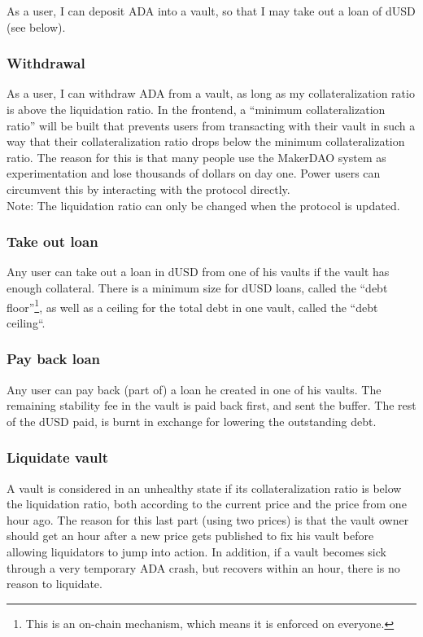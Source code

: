 \documentclass{article} %
\begin{document}
As a user, I can deposit ADA into a vault, so that I may take out a loan of dUSD
(see below).

\subsubsection*{Withdrawal}

As a user, I can withdraw ADA from a vault, as long as my collateralization
ratio is above the liquidation ratio.
In the frontend, a ``minimum collateralization ratio'' will be built that
prevents users from transacting with their vault in such a way that their
collateralization ratio drops below the minimum collateralization ratio.
The reason for this is that many people use the MakerDAO system as
experimentation and lose thousands of dollars on day one.
Power users can circumvent this by interacting with the protocol directly. \\

Note: The liquidation ratio can only be changed when the protocol is updated.

\subsubsection*{Take out loan}

Any user can take out a loan in dUSD from one of his vaults if the vault has
enough collateral. There is a minimum size for dUSD loans, called the ``debt
floor''\footnote{
  This is an on-chain mechanism, which means it is enforced on everyone.
}, as well as a ceiling for the total debt in one vault, called the ``debt
ceiling``.

\subsubsection*{Pay back loan}

Any user can pay back (part of) a loan he created in one of his vaults. The
remaining stability fee in the vault is paid back first, and sent the buffer.
The rest of the dUSD paid, is burnt in exchange for lowering the outstanding
debt.

\subsubsection*{Liquidate vault}

A vault is considered in an unhealthy state if its collateralization ratio is
below the liquidation ratio, both according to the current price and the price
from one hour ago.
The reason for this last part (using two prices) is that the vault owner should
get an hour after a new price gets published to fix his vault before allowing
liquidators to jump into action.
In addition, if a vault becomes sick through a very temporary ADA crash, but
recovers within an hour, there is no reason to liquidate. \\
\end{document}
